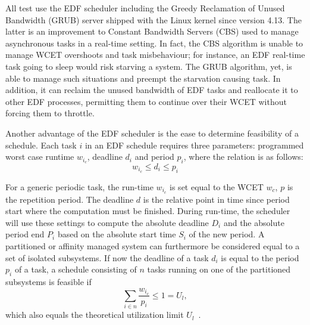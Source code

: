 \documentclass[]{scrartcl}
\begin{document}
All test use the EDF scheduler including the Greedy Reclamation of Unused Bandwidth (GRUB) server shipped with the Linux kernel since version 4.13.
The latter is an improvement to Constant Bandwidth Servers (CBS) used to manage asynchronous tasks in a real-time setting. 
In fact, the CBS algorithm is unable to manage WCET overshoots and task misbehaviour; for instance, an EDF real-time task going to sleep would risk starving a system. 
The GRUB algorithm, yet, is able to manage such situations and preempt the starvation causing task. 
In addition, it can reclaim the unused bandwidth of EDF tasks and reallocate it to other EDF processes, permitting them to continue over their WCET without forcing them to throttle.

Another advantage of the EDF scheduler is the ease to determine feasibility of a schedule.
Each task $i$ in an EDF schedule requires three parameters: programmed worst case runtime $w_{i_c}$, deadline $d_i$ and period $p_i$, where the relation is as follows:
\begin{equation}
w_{i_c} \le d_i \le p_i
\end{equation}

For a generic periodic task, the run-time $w_{i_c}$ is set equal to the WCET $w_c$, $p$ is the repetition period. The deadline $d$ is the relative point in time since period start where the computation must be finished. 
During run-time, the scheduler will use these settings to compute the absolute deadline $D_i$ and the absolute period end $P_i$ based on the absolute start time $S_i$ of the new period.
A partitioned or affinity managed system can furthermore be considered equal to a set of isolated subsystems.
If now the deadline of a task $d_i$ is equal to the period $p_i$ of a task, a schedule consisting of $n$ tasks running on one of the partitioned subsystems is feasible if
\begin{equation}
\sum_{i \in n} \frac{w_{i_c}}{p_i} \le 1 = U_l,
\end{equation}
which also equals the theoretical utilization limit $U_l$~\cite{Buttazzo2011}. 
\end{document}
